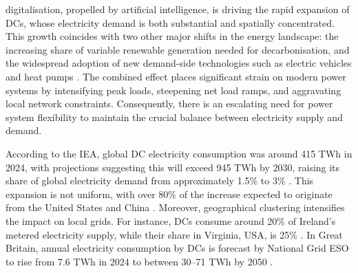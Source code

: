 \documentclass[lettersize,journal]{IEEEtran}
\begin{document}
 digitalisation, propelled by artificial intelligence, is driving the rapid expansion of DCs, whose electricity demand is both substantial and spatially concentrated. This growth coincides with two other major shifts in the energy landscape: the increasing share of variable renewable generation needed for decarbonisation, and the widespread adoption of new demand-side technologies such as electric vehicles and heat pumps \cite{Centrica2020LEM, EEAACER2023Flex}. The combined effect places significant strain on modern power systems by intensifying peak loads, steepening net load ramps, and aggravating local network constraints. Consequently, there is an escalating need for power system flexibility to maintain the crucial balance between electricity supply and demand.

According to the IEA, global DC electricity consumption was around 415 TWh in 2024, with projections suggesting this will exceed 945 TWh by 2030, raising its share of global electricity demand from approximately 1.5\% to 3\% \cite{iea_energy_ai}. This expansion is not uniform, with over 80\% of the increase expected to originate from the United States and China \cite{iea_energy_ai}. Moreover, geographical clustering intensifies the impact on local grids. For instance, DCs consume around 20\% of Ireland's metered electricity supply, while their share in Virginia, USA, is 25\% \cite{iea_energy_ai}. In Great Britain, annual electricity consumption by DCs is forecast by National Grid ESO to rise from 7.6 TWh in 2024 to between 30--71 TWh by 2050 \cite{neso2025future}.
\end{document}
